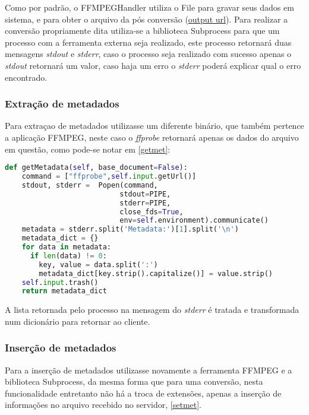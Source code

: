 Como por padrão, o FFMPEGHandler utiliza o File para gravar seus dados em sistema, e para obter o arquivo da pós conversão (\underline{output url}).
Para realizar a conversão propriamente dita utiliza-se a biblioteca Subprocess para que um processo com a ferramenta externa seja realizado, este processo retornará duas mensagens \textit{stdout} e \textit{stderr}, caso o processo seja realizado com sucesso apenas o \textit{stdout} retornará um valor, caso haja um erro o \textit{stderr} poderá explicar qual o erro encontrado.

\subsubsection{Extração de metadados}

Para extraçao de metadados utilizasse um diferente binário, que também pertence a aplicação FFMPEG, neste caso o \textit{ffprobe} retornará apenas os dados do arquivo em questão, como pode-se notar em \ref{getmet}:

{\singlespace
\begin{lstlisting}[caption=getMetadata do FFMPEGHandler,language=python,label={getmet}]
  def getMetadata(self, base_document=False):
    command = ["ffprobe",self.input.getUrl()]
    stdout, stderr =  Popen(command,
                           stdout=PIPE,
                           stderr=PIPE,
                           close_fds=True,
                           env=self.environment).communicate()
    metadata = stderr.split('Metadata:')[1].split('\n')
    metadata_dict = {}
    for data in metadata:
      if len(data) != 0:
        key, value = data.split(':')
        metadata_dict[key.strip().capitalize()] = value.strip()
    self.input.trash()
    return metadata_dict
\end{lstlisting}
}

A lista retornada pelo processo na mensagem do \textit{stderr} é tratada e transformada num dicionário para retornar ao cliente.


\subsubsection{Inserção de metadados}

Para a inserção de metadados utilizasse novamente a ferramenta FFMPEG e a biblioteca Subprocess, da mesma forma que para uma conversão, nesta funcionalidade entretanto não há a troca de extensões, apenas a inserção de informações no arquivo recebido no servidor, \ref{setmet}.

